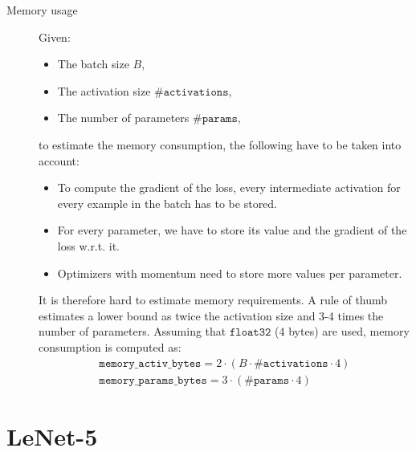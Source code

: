 \begin{description}
\begin{description}
            \item[Memory usage]
                Given:
                \begin{itemize}
                    \item The batch size $B$, 
                    \item The activation size $\texttt{\#activations}$, 
                    \item The number of parameters $\texttt{\#params}$, 
                \end{itemize}
                to estimate the memory consumption, the following have to be taken into account:
                \begin{itemize}
                    \item To compute the gradient of the loss, every intermediate activation for every example in the batch has to be stored.
                    \item For every parameter, we have to store its value and the gradient of the loss w.r.t. it.
                    \item Optimizers with momentum need to store more values per parameter.
                \end{itemize}

                It is therefore hard to estimate memory requirements. 
                A rule of thumb estimates a lower bound as twice the activation size and 3-4 times the number of parameters.
                Assuming that $\texttt{float32}$ (4 bytes) are used, memory consumption is computed as:
                \[
                    \begin{gathered}
                        \texttt{memory\_activ\_bytes} = 2 \cdot (B \cdot \texttt{\#activations} \cdot 4) \\
                        \texttt{memory\_params\_bytes} = 3 \cdot (\texttt{\#params} \cdot 4)
                    \end{gathered}  
                \]
        \end{description}
\end{description}


\section{LeNet-5}


